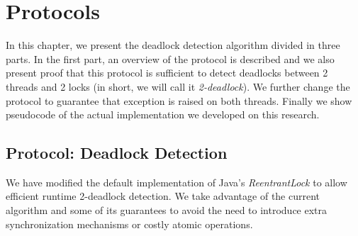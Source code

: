 \section{Protocols}

In this chapter, we present the deadlock detection algorithm divided in three parts. In the first part, an overview of the protocol is described and we also present proof that this protocol is sufficient to detect deadlocks between 2 threads and 2 locks (in short, we will call it \emph{2-deadlock}). We further change the protocol to guarantee that exception is raised on both threads. Finally we show pseudocode of the actual implementation we developed on this research.

\subsection{Protocol: Deadlock Detection}
We have modified the default implementation of Java's \emph{ReentrantLock} to allow efficient runtime 2-deadlock detection. We take advantage of the current algorithm and some of its guarantees to avoid the need to introduce extra synchronization mechanisms or costly atomic operations.

